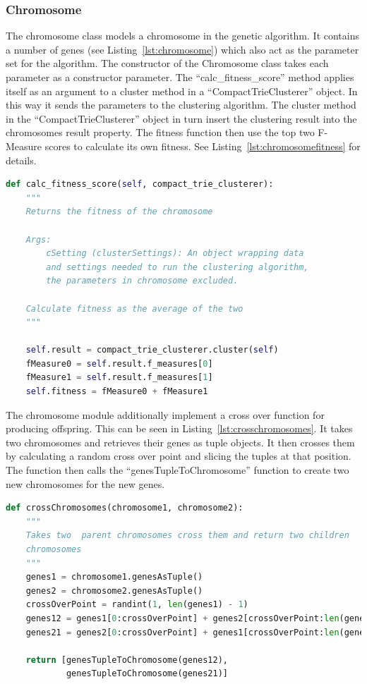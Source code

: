 \subsubsection{Chromosome}
The chromosome class models a chromosome in the genetic algorithm. It contains a number of genes (see Listing~\ref{lst:chromosome}) which also act as the parameter set for the \CTC algorithm. The constructor of the Chromosome class takes each parameter as a constructor parameter. The ``calc\_fitness\_score'' method applies itself as an argument to a cluster method in a ``CompactTrieClusterer'' object. In this way it sends the \CTC parameters to the clustering algorithm. The cluster method in the ``CompactTrieClusterer'' object in turn insert the clustering result into the chromosomes result property. The fitness function then use the top two F-Measure scores to calculate its own fitness. See Listing~\ref{lst:chromosomefitness} for details.

\begin{lstlisting}[float=ht, language=python, breaklines=true, label=lst:chromosomefitness, caption={Fitness function in the Chromosome class.}]
def calc_fitness_score(self, compact_trie_clusterer):
    """
    Returns the fitness of the chromosome

    Args:
        cSetting (clusterSettings): An object wrapping data
        and settings needed to run the clustering algorithm,
        the parameters in chromosome excluded.

    Calculate fitness as the average of the two
    """

    self.result = compact_trie_clusterer.cluster(self)
    fMeasure0 = self.result.f_measures[0]
    fMeasure1 = self.result.f_measures[1]
    self.fitness = fMeasure0 + fMeasure1
\end{lstlisting}

The chromosome module additionally implement a cross over function for producing offspring. This can be seen in Listing~\ref{lst:crosschromosomes}. It takes two chromosomes and retrieves their genes as tuple objects. It then crosses them by calculating a random cross over point and slicing the tuples at that position. The function then calls the ``genesTupleToChromosome'' function to create two new chromosomes for the new genes.

\begin{lstlisting}[float=ht, language=python, breaklines=true, label=lst:crosschromosomes, caption={Code for crossing chromosomes}]
def crossChromosomes(chromosome1, chromosome2):
    """
    Takes two  parent chromosomes cross them and return two children
    chromosomes
    """
    genes1 = chromosome1.genesAsTuple()
    genes2 = chromosome2.genesAsTuple()
    crossOverPoint = randint(1, len(genes1) - 1)
    genes12 = genes1[0:crossOverPoint] + genes2[crossOverPoint:len(genes2)]
    genes21 = genes2[0:crossOverPoint] + genes1[crossOverPoint:len(genes1)]

    return [genesTupleToChromosome(genes12),
            genesTupleToChromosome(genes21)]
\end{lstlisting}

